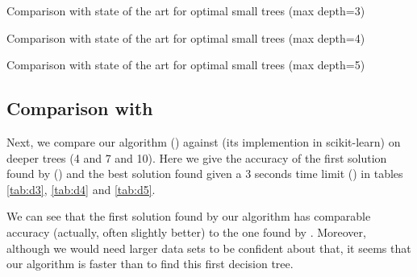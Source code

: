 \documentclass{article}
\begin{document}
\begin{table}[htbp]
\begin{center}
\begin{normalsize}
\tabcolsep=5pt

\end{normalsize}
\end{center}
\caption{\label{tab:d3} Comparison with state of the art for optimal small trees (max depth=3)}
\end{table}

\begin{table}[htbp]
\begin{center}
\begin{normalsize}
\tabcolsep=5pt

\end{normalsize}
\end{center}
\caption{\label{tab:d4} Comparison with state of the art for optimal small trees (max depth=4)}
\end{table}

\begin{table}[htbp]
\begin{center}
\begin{normalsize}
\tabcolsep=5pt

\end{normalsize}
\end{center}
\caption{\label{tab:d5} Comparison with state of the art for optimal small trees (max depth=5)}
\end{table}



\subsection*{Comparison with \cart}

Next, we compare our algorithm (\budalg) against \cart (its implemention in scikit-learn) on deeper trees (4 and 7 and 10). Here we give the accuracy of the first solution found by \budalg (\greedy) and the best solution found given a 3 seconds time limit (\budalg) in tables \ref{tab:d3}, \ref{tab:d4} and \ref{tab:d5}.

\medskip

We can see that the first solution found by our algorithm has comparable accuracy (actually, often slightly better) to the one found by \cart. Moreover, although we would need larger data sets to be confident about that, it seems that our algorithm is faster than \cart to find this first decision tree. %
\end{document}
